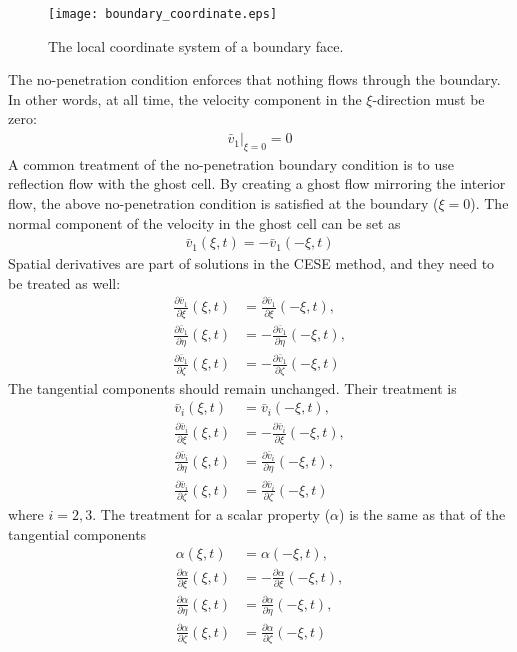 \documentclass[a4paper,12pt,dvips]{article}
\begin{document}
\begin{figure}[htbp]
\centering
\texttt{[image: boundary\_coordinate.eps]}
\caption{The local coordinate system of a boundary face.}
\label{f:boundary_coordinate}
\end{figure}

The no-penetration condition enforces that nothing flows through the boundary.
In other words, at all time, the velocity component in the $\xi$-direction must
be zero:
\begin{align*}
  \left.\bar{v}_1\right|_{\xi=0} = 0
\end{align*}
A common treatment of the no-penetration boundary condition is to use
reflection flow with the ghost cell.  By creating a ghost flow mirroring the
interior flow, the above no-penetration condition is satisfied at the boundary
($\xi = 0$).  The normal component of the velocity in the ghost cell can be set
as
\begin{align*}
  \bar{v}_1(\xi, t) = -\bar{v}_1(-\xi, t)
\end{align*}
Spatial derivatives are part of solutions in the CESE method, and they need to
be treated as well:
\begin{align*}
  \frac{\partial \bar{v}_1}{\partial\xi}(\xi, t) &=
  \frac{\partial \bar{v}_1}{\partial\xi}(-\xi, t), \\
  \frac{\partial \bar{v}_1}{\partial\eta}(\xi, t) &=
  -\frac{\partial \bar{v}_1}{\partial\eta}(-\xi, t), \\
  \frac{\partial \bar{v}_1}{\partial\zeta}(\xi, t) &=
  -\frac{\partial \bar{v}_1}{\partial\zeta}(-\xi, t)
\end{align*}
The tangential components should remain unchanged.  Their treatment is
\begin{align*}
  \bar{v}_i(\xi, t) &= \bar{v}_i(-\xi, t), \\
  \frac{\partial \bar{v}_i}{\partial\xi}(\xi, t) &=
  -\frac{\partial \bar{v}_i}{\partial\xi}(-\xi, t), \\
  \frac{\partial \bar{v}_i}{\partial\eta}(\xi, t) &=
  \frac{\partial \bar{v}_i}{\partial\eta}(-\xi, t), \\
  \frac{\partial \bar{v}_i}{\partial\zeta}(\xi, t) &=
  \frac{\partial \bar{v}_i}{\partial\zeta}(-\xi, t)
\end{align*}
where $i = 2, 3$.  The treatment for a scalar property ($\alpha$) is the same
as that of the tangential components
\begin{align*}
  \alpha(\xi, t) &= \alpha(-\xi, t), \\
  \frac{\partial \alpha}{\partial\xi}(\xi, t) &=
  -\frac{\partial \alpha}{\partial\xi}(-\xi, t), \\
  \frac{\partial \alpha}{\partial\eta}(\xi, t) &=
  \frac{\partial \alpha}{\partial\eta}(-\xi, t), \\
  \frac{\partial \alpha}{\partial\zeta}(\xi, t) &=
  \frac{\partial \alpha}{\partial\zeta}(-\xi, t)
\end{align*}
\end{document}
